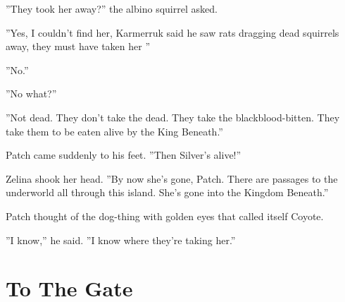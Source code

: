 \documentclass[12pt]{book}
\begin{document}
 ''They took her away?'' the albino squirrel asked.\par
 ''Yes, I couldn't find her, Karmerruk said he saw rats dragging dead squirrels away, they must have taken her %
''\par
 ''No.''\par
 ''No what?''\par
 ''Not dead. They don't take the dead. They take the blackblood-bitten. They take them to be eaten alive by the King Beneath.''\par
 Patch came suddenly to his feet. ''Then Silver's alive!''\par
 Zelina shook her head. ''By now she's gone, Patch. There are passages to the underworld all through this island. She's gone into the Kingdom Beneath.''\par
 Patch thought of the dog-thing with golden eyes that called itself Coyote.\par
 ''I know,'' he said. ''I know where they're taking her.''\par

\section{To The Gate}
\end{document}
